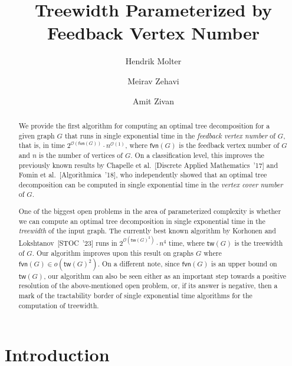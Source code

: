 \documentclass[a4paper,UKenglish,cleveref, autoref, thm-restate, numberwithinsect]{lipics-v2021}
\title{Treewidth Parameterized by Feedback Vertex Number}
\author{Hendrik Molter}{Department of Computer Science, Ben-Gurion~University~of~the~Negev, 
	Beer-Sheva, 
	Israel}{molterh@post.bgu.ac.il}{https://orcid.org/0000-0002-4590-798X}{}
\author{Meirav Zehavi}{Department of Computer Science, Ben-Gurion~University~of~the~Negev, 
	Beer-Sheva, 
	Israel}{meiravze@bgu.ac.il}{https://orcid.org/0000-0002-3636-5322}{}
\author{Amit Zivan}{Department of Computer Science, Ben-Gurion~University~of~the~Negev, 
	Beer-Sheva, 
	Israel}{amitziv@post.bgu.ac.il}{}{}
\newcounter{algorithm}
\newcommand{\OO}{\mathcal{O}}
\newcommand{\tw}{\mathsf{tw}}
\newcommand{\fvn}{\mathsf{fvn}}
\begin{document}
\maketitle

\begin{abstract}
We provide the first algorithm for computing an optimal tree decomposition for a given graph $G$ that runs in single exponential time in the \emph{feedback vertex number} of $G$, that is, in time $2^{\OO(\fvn(G))}\cdot n^{\OO(1)}$, where $\fvn(G)$ is the feedback vertex number of $G$ and $n$ is the number of vertices of $G$. 
On a classification level, this improves the previously known results by Chapelle et al.~[Discrete Applied Mathematics~'17] and Fomin et al.~[Algorithmica~'18], who independently showed that an optimal tree decomposition can be computed in single exponential time in the \emph{vertex cover number} of $G$. 

One of the biggest open problems in the area of parameterized complexity is whether we can compute an optimal tree decomposition in single exponential time in the \emph{treewidth} of the input graph. The currently best known algorithm by Korhonen and Lokshtanov~[STOC~'23] runs in $2^{\OO(\tw(G)^2)}\cdot n^4$ time, where $\tw(G)$ is the treewidth of $G$. Our algorithm improves upon this result on graphs $G$ where $\fvn(G)\in o(\tw(G)^2)$. On a different note, since $\fvn(G)$ is an upper bound on $\tw(G)$, our algorithm can also be seen either as an important step towards a positive resolution of the above-mentioned open problem, or, if its answer is negative, then a mark of the tractability border of single exponential time algorithms for the computation of treewidth.

\end{abstract}



\section{Introduction}
\end{document}

